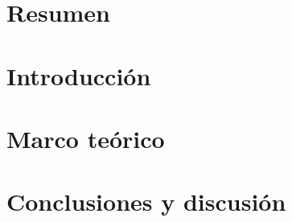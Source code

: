 \documentclass[12pt,letterpaper]{article}
\begin{document}

\pagebreak
\section*{Resumen}

\section*{Introducción}

\section*{Marco teórico}

\section*{Conclusiones y discusión}


\nocite{*}

\end{document}
